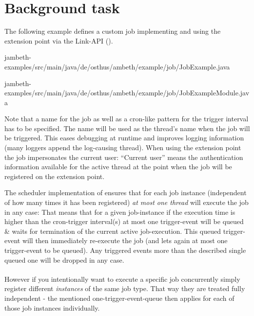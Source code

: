 \goodbreak
\section{Background task}
\label{feature:BackgroundTask}
The following example defines a custom job implementing  and using the extension point  via the Link-API ().

{jambeth-examples/src/main/java/de/osthus/ambeth/example/job/JobExample.java}

{jambeth-examples/src/main/java/de/osthus/ambeth/example/job/JobExampleModule.java}

Note that a name for the job as well as a cron-like pattern for the trigger interval has to be specified. The name will be used as the thread's name when the job will be triggered. This eases debugging at runtime and improves logging information (many loggers append the log-causing thread). When using the extension point the job impersonates the current user: ``Current user'' means the authentication information available for the active thread at the point when the job will be registered on the extension point.


The scheduler implementation of \AMBETH{} ensures that for each job instance (independent of how many times it has been registered) \emph{at most one thread} will execute the job in any case: That means that for a given job-instance if the execution time is higher than the cron-trigger interval(s) at most one trigger-event will be queued \& waits for termination of the current active job-execution. This queued trigger-event will then immediately re-execute the job (and lets again at most one trigger-event to be queued). Any triggered events more than the described single queued one will be dropped in any case.\\\\

However if you intentionally want to execute a specific job concurrently simply register different \emph{instances} of the same job type. That way they are treated fully independent - the mentioned one-trigger-event-queue then applies for each of those job instances individually.